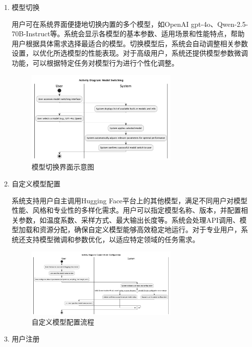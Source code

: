 \documentclass[
    report,     %
    oneside,    %
    UTF8,       %
    zihao=-4    %
]{config} %
\begin{document}
\begin{enumerate}[label=(\arabic*)]
    \item 模型切换
    
    用户可在系统界面便捷地切换内置的多个模型，如OpenAI gpt-4o、Qwen-2.5-70B-Instruct等。系统会显示各模型的基本参数、适用场景和性能特点，帮助用户根据具体需求选择最适合的模型。切换模型后，系统会自动调整相关参数设置，以优化所选模型的性能表现。对于高级用户，系统还提供模型参数微调功能，可以根据特定任务对模型行为进行个性化调整。
    \begin{figure}[H]
        \centering
        \includegraphics[width=0.7\textwidth]{UML/Activity/Model-Switching.png}
        \caption{模型切换界面示意图}
        \label{fig:ModelSwitchingInterface}
    \end{figure}
    
    \item 自定义模型配置
    
    系统支持用户自主调用Hugging Face平台上的其他模型，满足不同用户对模型性能、风格和专业性的多样化需求。用户可以指定模型名称、版本，并配置相关参数，如温度系数、采样方式、最大输出长度等。系统会处理API调用、模型加载和资源分配，确保自定义模型能够高效稳定地运行。对于专业用户，系统还支持模型微调和参数优化，以适应特定领域的任务需求。
    \begin{figure}[H]
        \centering
        \includegraphics[width=0.7\textwidth]{UML/Activity/Custom-Model-Configuration.png}
        \caption{自定义模型配置流程}
        \label{fig:CustomModelConfiguration}
    \end{figure}
    
    \item 用户注册
    

\end{enumerate}
\end{document}
